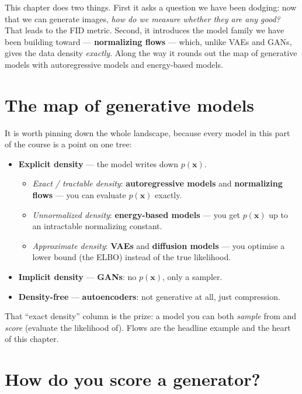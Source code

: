 \documentclass[11pt, oneside]{book}
\newcommand{\xvec}{\mathbf{x}}
\begin{document}
This chapter does two things. First it asks a question we have been dodging: now
that we can generate images, \emph{how do we measure whether they are any good?}
That leads to the FID metric. Second, it introduces the model family we have been
building toward --- \textbf{normalizing flows} --- which, unlike VAEs and GANs,
gives the data density \emph{exactly}. Along the way it rounds out the map of
generative models with autoregressive models and energy-based models.

\section{The map of generative models}

It is worth pinning down the whole landscape, because every model in this part of
the course is a point on one tree:

\begin{itemize}
  \item \textbf{Explicit density} --- the model writes down $p(\xvec)$.
    \begin{itemize}
      \item \emph{Exact / tractable density}: \textbf{autoregressive models} and
            \textbf{normalizing flows} --- you can evaluate $p(\xvec)$ exactly.
      \item \emph{Unnormalized density}: \textbf{energy-based models} --- you get
            $p(\xvec)$ up to an intractable normalizing constant.
      \item \emph{Approximate density}: \textbf{VAEs} and \textbf{diffusion models}
            --- you optimise a lower bound (the ELBO) instead of the true
            likelihood.
    \end{itemize}
  \item \textbf{Implicit density} --- \textbf{GANs}: no $p(\xvec)$, only a sampler.
  \item \textbf{Density-free} --- \textbf{autoencoders}: not generative at all,
        just compression.
\end{itemize}

That ``exact density'' column is the prize: a model you can both \emph{sample}
from and \emph{score} (evaluate the likelihood of). Flows are the headline example
and the heart of this chapter.

\section{How do you score a generator?}
\end{document}
